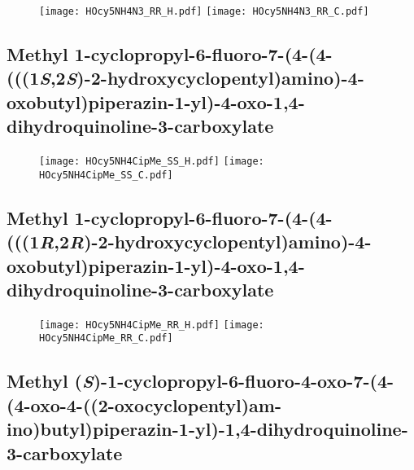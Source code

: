 \begin{figure}[H]
	\centering
		\texttt{[image: HOcy5NH4N3\_RR\_H.pdf]}
		\texttt{[image: HOcy5NH4N3\_RR\_C.pdf]}
\end{figure}

\subsection{Methyl 1\hyp{}cyclopropyl\hyp{}6\hyp{}fluoro\hyp{}7\hyp{}(4\hyp{}(4\hyp{}(((1\textit{S},2\textit{S})\hyp{}2\hyp{}hydroxycyclopentyl)amino)\hyp{}4\hyp{}oxobutyl)piperazin\hyp{}1\hyp{}yl)\hyp{}4\hyp{}oxo\hyp{}1,4\hyp{}dihydroquinoline\hyp{}3\hyp{}carboxylate }

\begin{figure}[H]
	\centering
		\texttt{[image: HOcy5NH4CipMe\_SS\_H.pdf]}
		\texttt{[image: HOcy5NH4CipMe\_SS\_C.pdf]}
\end{figure}

\subsection{Methyl 1\hyp{}cyclopropyl\hyp{}6\hyp{}fluoro\hyp{}7\hyp{}(4\hyp{}(4\hyp{}(((1\textit{R},2\textit{R})\hyp{}2\hyp{}hydroxycyclopentyl)amino)\hyp{}4\hyp{}oxobutyl)piperazin\hyp{}1\hyp{}yl)\hyp{}4\hyp{}oxo\hyp{}1,4\hyp{}dihydroquinoline\hyp{}3\hyp{}carboxylate }

\begin{figure}[H]
	\centering
		\texttt{[image: HOcy5NH4CipMe\_RR\_H.pdf]}
		\texttt{[image: HOcy5NH4CipMe\_RR\_C.pdf]}
\end{figure}

\subsection{Methyl (\textit{S})\hyp{}1\hyp{}cyclopropyl\hyp{}6\hyp{}fluoro\hyp{}4\hyp{}oxo\hyp{}7\hyp{}(4\hyp{}(4\hyp{}oxo\hyp{}4\hyp{}((2\hyp{}oxocyclopentyl)am\hyp{}ino)butyl)piperazin\hyp{}1\hyp{}yl)\hyp{}1,4\hyp{}dihydroquinoline\hyp{}3\hyp{}carboxylate }

